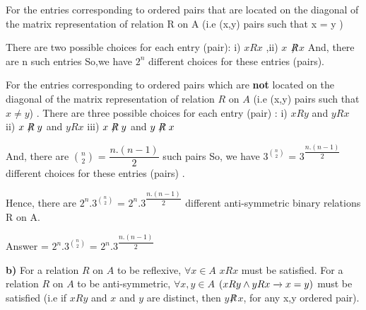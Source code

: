 \documentclass[11pt]{article}
\begin{document}
\noindent For the entries corresponding to ordered pairs that are located on the diagonal of the matrix representation of relation R on A (i.e (x,y) pairs such that x = y )  \newline

\noindent There are two possible choices for each entry (pair): i) $xRx$ \space,\space ii) $x$ $\not\mathrel{R}$$x$ \newline
And, there are n such entries \newline \newline
So,we have $2^n$ different choices for these entries (pairs). \newline \newline \newline 

\noindent For the entries corresponding to ordered pairs which are \textbf{not} located on the diagonal of the matrix representation of relation $R$ on $A$ (i.e (x,y) pairs such that $x \neq y$) .
\newline \newline
There are three possible choices for each entry (pair) : \newline \newline
i) $xRy$ and $yRx$ \newline
ii) $x\not\mathrel{R}y$ and $yRx$ \newline
iii) $x\not\mathrel{R}y$ and $y\not\mathrel{R}x$ \newline \newline

\noindent And, there are ${n \choose 2}$ = $\dfrac{n.(n-1)}{2}$ such pairs \newline
\newline So, we have $3^{n \choose 2}$ = $3^{\dfrac{n.(n-1)}{2}}$ different choices for these entries (pairs) . \newline \newline \newline


\noindent Hence, there are $2^n.3^{n \choose 2}$ = $2^n.3^{\dfrac{n.(n-1)}{2}}$  different anti-symmetric binary relations R on A. \newline \newline


\noindent Answer =  $2^n.3^{n \choose 2}$ = $2^n.3^{\dfrac{n.(n-1)}{2}}$

\newpage
\noindent \textbf{b)} \newline \newline
For a relation $R$ on $A$ to be reflexive, $\forall x \in A$ $xRx$ must be satisfied.  \newline \newline
For a relation $R$ on $A$ to be anti-symmetric, $\forall x,y \in A $ $\space (xRy \wedge yRx \xrightarrow{} x = y )$ must be satisfied (i.e if $xRy$ and $x$ and $y$ are distinct, then $y$$\not \mathrel{R}$$x$, for any x,y ordered pair).  \newline \newline
\end{document}
